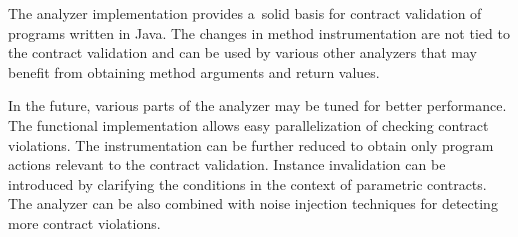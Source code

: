 The analyzer implementation provides a~solid basis for contract validation of
programs written in Java. The changes in method instrumentation are not tied to
the contract validation and can be used by various other analyzers that may
benefit from obtaining method arguments and return values.

In the future, various parts of the analyzer may be tuned for better
performance. The functional implementation allows easy parallelization of
checking contract violations. The instrumentation can be further reduced to
obtain only program actions relevant to the contract validation. Instance
invalidation can be introduced by clarifying the conditions in the context of
parametric contracts. The analyzer can be also combined with noise injection
techniques for detecting more contract violations.

